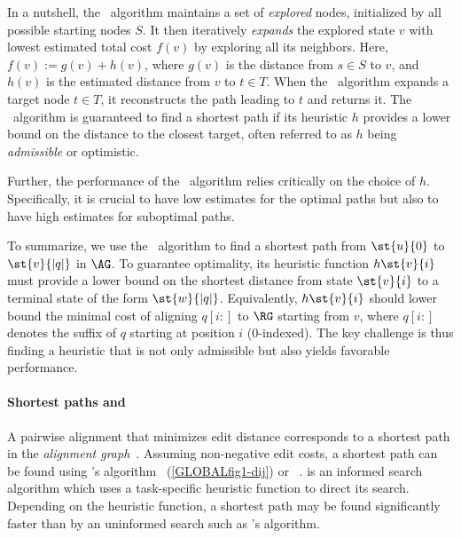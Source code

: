 % 
In a nutshell, the \A~algorithm maintains a set of \emph{explored} nodes,
initialized by all possible starting nodes $S$. It then iteratively
\emph{expands} the explored state $v$ with lowest estimated total cost $f(v)$ by
exploring all its neighbors. Here, $f(v) := g(v) + h(v)$, where $g(v)$ is the
distance from $s \in S$ to $v$, and $h(v)$ is the estimated distance from $v$ to
$t \in T$.
%
When the \A~algorithm expands a target node $t \in T$, it reconstructs the path
leading to $t$ and returns it.
%
%
The \A~algorithm is guaranteed to find a shortest path if its heuristic $h$
provides a lower bound on the distance to the closest target, often referred to
as $h$ being \emph{admissible} or optimistic.

Further, the performance of the \A~algorithm relies critically on the choice of
$h$. Specifically, it is crucial to have low estimates for the optimal paths but
also to have high estimates for suboptimal paths.

%
To summarize, we use the \A~algorithm to find a shortest path from $\st{u}{0}$
to $\st{v}{|q|}$ in $\AG$. To guarantee optimality, its heuristic function
$h\st{v}{i}$ must provide a lower bound on the shortest distance from state
$\st{v}{i}$ to a terminal state of the form $\st{w}{\lvert q \rvert}$.
%
Equivalently, $h\st{v}{i}$ should lower bound the minimal cost of aligning
$q[i{:}]$ to $\RG$ starting from $v$, where $q[i{:}]$ denotes the suffix of $q$
starting at position $i$ ($0$-indexed).
%
The key challenge is thus finding a heuristic that is not only admissible but
also yields favorable performance.

\paragraph{Shortest paths and \A}
A pairwise alignment that minimizes edit distance corresponds to a shortest path
in the \emph{alignment graph}~\citep{vintsyuk1968speech,ukkonen1985algorithms}.
Assuming non-negative edit costs, a shortest path can be found using \dijkstra's
algorithm~\citep{ukkonen1985algorithms} (\cref{GLOBALfig1-dij}) or
\A~\citep{spouge1989speeding}. \A is an informed search algorithm which uses a
task-specific heuristic function to direct its search. Depending on the
heuristic function, a shortest path may be found significantly faster than by an
uninformed search such as \dijkstra's algorithm.
